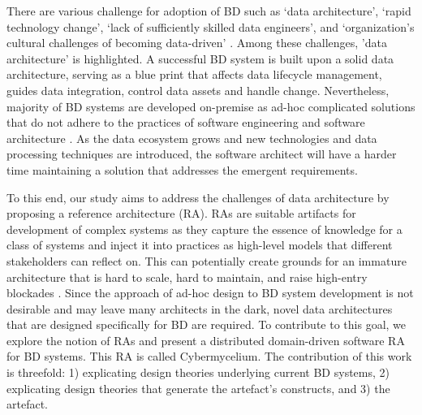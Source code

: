 \documentclass{bmcart}
\begin{document}
There are various challenge for adoption of BD such as `data architecture', `rapid technology change', `lack of sufficiently skilled data engineers', and `organization's cultural challenges of becoming data-driven' \cite{AtaeiBigDataEnvirons, Singh}. Among these challenges, 'data architecture' is highlighted. A successful BD system is built upon a solid data architecture, serving as a blue print that affects data lifecycle management, guides data integration, control data assets and handle change. Nevertheless, majority of BD systems are developed on-premise as ad-hoc complicated solutions that do not adhere to the practices of software engineering and software architecture \cite{Gorton,Nadal}. As the data ecosystem grows and new technologies and data processing techniques are introduced, the software architect will have a harder time maintaining a solution that addresses the emergent requirements.

To this end, our study aims to address the challenges of data architecture by proposing a reference architecture (RA). RAs are suitable artifacts for development of complex systems as they capture the essence of knowledge for a class of systems and inject it into practices as high-level models that different stakeholders can reflect on. This can potentially create grounds for an immature architecture that is hard to scale, hard to maintain, and raise high-entry blockades \cite{AtaeiApsec}. Since the approach of ad-hoc design to BD system development is not desirable and may leave many architects in the dark, novel data architectures that are designed specifically for BD are required. To contribute to this goal, we explore the notion of RAs and present a distributed domain-driven software RA for BD systems. This RA is called Cybermycelium. The contribution of this work is threefold: 1) explicating design theories underlying current BD systems, 2) explicating design theories that generate the artefact's constructs, and 3) the artefact. 

\end{document}
